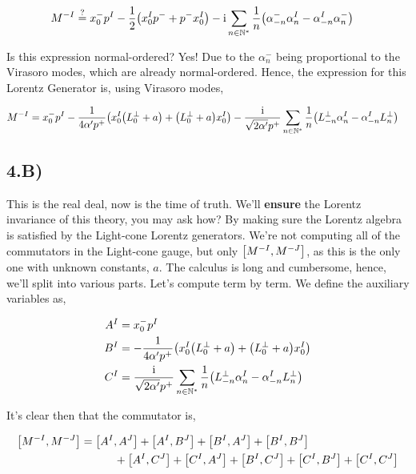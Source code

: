 \begin{align*}
    M^{-I}&\stackrel{?}{=}x_0^- p^I-\frac12\qty(x_0^I p^-+p^-x_0^I)-\textnormal{i}\sum\limits_{n\in\mathbb N^\ast}\frac{1}{n}\qty(\alpha^-_{-n}\alpha^I_{n}-\alpha^I_{-n}\alpha^-_{n})
\end{align*}

Is this expression normal-ordered? Yes! Due to the $\alpha_n^-$ being proportional to the Virasoro modes, which are already normal-ordered. Hence, the expression for this 
Lorentz Generator is, using Virasoro modes,

\begin{align*}
    M^{-I}&=x_0^- p^I-\frac{1}{4\alpha'p^+}\qty(x_0^I\qty(L_0^\perp+a)+\qty(L_0^\perp+a)x_0^I)-\frac{\textnormal{i}}{\sqrt{2\alpha'}p^+}\sum\limits_{n\in\mathbb N^\ast}\frac{1}{n}\qty(L^\perp_{-n}\alpha^I_{n}-\alpha^I_{-n}L^\perp_n)
\end{align*}

\subsection{4.B)}

This is the real deal, now is the time of truth. We'll \textbf{ensure} the Lorentz invariance of this theory, you may ask how? 
By making sure the Lorentz algebra is satisfied by the Light-cone Lorentz generators. We're not computing all of the commutators in 
the Light-cone gauge, but only $\comm{M^{-I}}{M^{-J}}$, as this is the only one with unknown constants, $a$. The calculus is long and 
cumbersome, hence, we'll split into various parts. Let's compute term by term. We define the auxiliary variables as,

\begin{align*}
    A^I&=x_0^- p^I\\
    B^I&=-\frac{1}{4\alpha'p^+}\qty(x_0^I\qty(L_0^\perp+a)+\qty(L_0^\perp+a)x_0^I)\\
    C^I&=\frac{\textnormal{i}}{\sqrt{2\alpha'}p^+}\sum\limits_{n\in\mathbb N^\ast}\frac{1}{n}\qty(L^\perp_{-n}\alpha^I_{n}-\alpha^I_{-n}L^\perp_n)
\end{align*}

It's clear then that the commutator is,

\begin{align*}
    \comm{M^{-I}}{M^{-J}}&=\comm{A^I}{A^J}+\comm{A^I}{B^J}+\comm{B^I}{A^J}+\comm{B^I}{B^J}\\
    &\quad\quad\quad+\comm{A^I}{C^J}+\comm{C^I}{A^J}+\comm{B^I}{C^J}+\comm{C^I}{B^J}+\comm{C^I}{C^J}
\end{align*}

